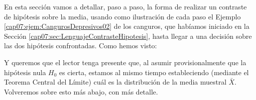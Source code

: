 En esta sección vamos a detallar, paso a paso, la forma de realizar un contraste de hipótesis sobre la media, usando como ilustración de cada paso el Ejemplo \ref{cap07:ejem:CangurosDepresivos02} de los canguros, que habíamos iniciado en la Sección \ref{cap07:sec:LenguajeContrasteHipotesis}, hasta llegar a una decisión sobre las dos hipótesis confrontadas. Como hemos visto:

    \begin{center}
    \end{center}

Y queremos que el lector tenga presente que, al asumir provisionalmente que la hipótesis nula $H_0$ es cierta, estamos al mismo tiempo estableciendo (mediante el Teorema Central del Límite) cuál es la distribución de la media muestral $\bar X$. Volveremos sobre esto más abajo, con más detalle.

